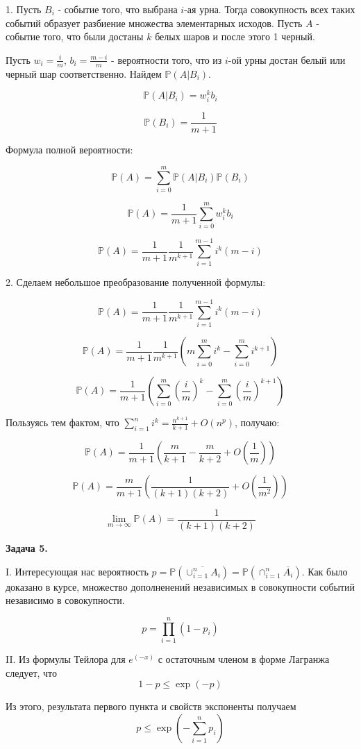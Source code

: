 \documentclass[12pt]{article}
\begin{document}
1. Пусть $B_i$ - событие того, что выбрана $i$-ая урна. Тогда совокупность всех таких событий образует разбиение множества элементарных исходов. Пусть $A$ - событие того, что были достаны $k$ белых шаров и после этого 1 черный.

Пусть $w_i = \frac{i}{m}$, $b_i = \frac{m-i}{m}$ - вероятности того, что из $i$-ой урны достан белый или черный шар соответственно. Найдем $\mathbb{P}(A|B_i)$.

$$\mathbb{P}(A|B_i) = w_i^kb_i$$

$$\mathbb{P}(B_i) = \frac{1}{m+1}$$

Формула полной вероятности:

$$\mathbb{P}(A) = \sum\limits_{i=0}^{m}\mathbb{P}(A|B_i)\mathbb{P}(B_i)$$

$$\mathbb{P}(A) = \frac{1}{m+1}\sum\limits_{i=0}^{m} w_i^kb_i$$

$$\boxed{\mathbb{P}(A) = \frac{1}{m+1}\frac{1}{m^{k+1}}\sum\limits_{i=1}^{m-1} i^k(m-i)}$$

2. Сделаем небольшое преобразование полученной формулы:

$$\mathbb{P}(A) = \frac{1}{m+1}\frac{1}{m^{k+1}}\sum\limits_{i=1}^{m-1} i^k(m-i)$$

$$\mathbb{P}(A) = \frac{1}{m+1}\frac{1}{m^{k+1}}\left(m\sum\limits_{i=0}^{m} i^k-\sum\limits_{i=0}^{m} i^{k+1}\right)$$

$$\mathbb{P}(A) = \frac{1}{m+1}\left(\sum\limits_{i=0}^{m} \left(\frac{i}{m}\right)^k-\sum\limits_{i=0}^{m} \left(\frac{i}{m}\right)^{k+1}\right)$$

Пользуясь тем фактом, что $\sum\limits_{i=1}^ni^k = \frac{n^{k+1}}{k+1} + O(n^p)$, получаю:

$$\mathbb{P}(A) = \frac{1}{m+1}\left(\frac{m}{k+1}-\frac{m}{k+2}+O\left(\frac{1}{m}\right)\right)$$

$$\mathbb{P}(A) = \frac{m}{m+1}\left(\frac{1}{(k+1)(k+2)}+O\left(\frac{1}{m^2}\right)\right)$$

$$\boxed{\lim\limits_{m\rightarrow\infty}\mathbb{P}(A)=\frac{1}{(k+1)(k+2)}}$$


\begin{center}
\textbf{Задача 5.}
\end{center}

I. Интересующая нас вероятность $p=\mathbb{P}(\overline{\cup_{i=1}^nA_i})=\mathbb{P}(\cap_{i=1}^n\overline{A_i})$. Как было доказано в курсе, множество дополненений независимых в совокупности событий независимо в совокупности. 

$$\boxed{p= \prod\limits_{i = 1}^n(1-p_i)}$$

II. Из формулы Тейлора для $e^(-x)$ с остаточным членом в форме Лагранжа следует, что $$1 - p\leq\exp(-p)$$

Из этого, результата первого пункта и свойств экспоненты получаем $$\boxed{p\leq\exp\left(-\sum\limits_{i=1}^np_i\right)}$$
\end{document}
